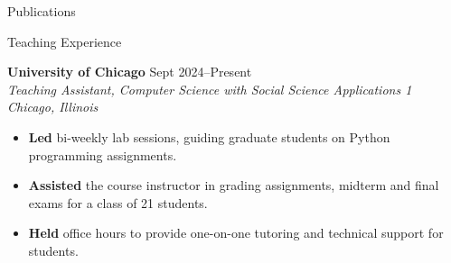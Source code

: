 \documentclass{resume} %
\begin{document}
\begin{rSection}{Publications}
\nocite{*}
\printbibliography[heading=none]

\end{rSection}

\begin{rSection}{Teaching Experience}

\textbf{University of Chicago} \hfill {Sept 2024--Present} \\
\textit{Teaching Assistant, Computer Science with Social Science Applications 1} \hfill {\textit{Chicago, Illinois}}
 \begin{itemize}
    \itemsep -5pt {} 
    \item \textbf{Led} bi-weekly lab sessions, guiding graduate students on Python programming assignments.
    \item \textbf{Assisted} the course instructor in grading assignments, midterm and final exams for a class of 21 students.
    \item \textbf{Held} office hours to provide one-on-one tutoring and technical support for students.

 \end{itemize}
\end{rSection}

\end{document}
